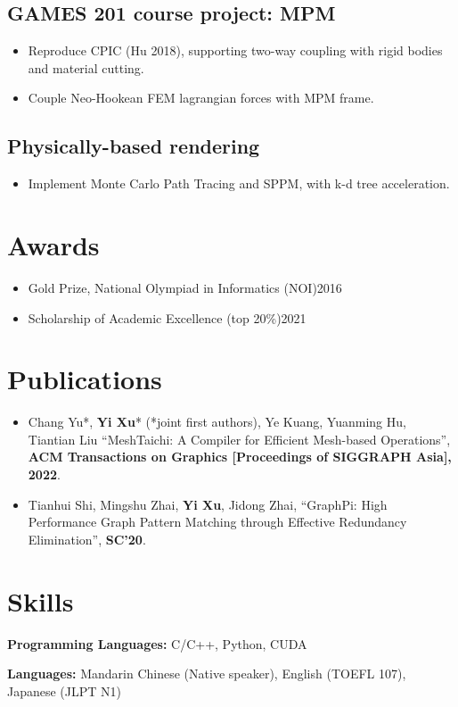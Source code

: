 \documentclass{resume}
\begin{document}
\subsection{\textbf{GAMES 201 course project: MPM}}
\begin{itemize}
  \item Reproduce CPIC (Hu 2018), supporting two-way coupling with rigid bodies and material cutting.
  \item Couple Neo-Hookean FEM lagrangian forces with MPM frame.
\end{itemize}

\subsection{\textbf{Physically-based rendering}}
\begin{itemize}
  \item Implement Monte Carlo Path Tracing and SPPM, with k-d tree acceleration.
\end{itemize}

\section{Awards}
\begin{itemize}
  \item Gold Prize, National Olympiad in Informatics (NOI)\hfill 2016
  \item Scholarship of Academic Excellence (top 20\%)\hfill 2021
\end{itemize}

\section{Publications}
\begin{itemize}
  \item Chang Yu*, \textbf{Yi Xu}* (*joint first authors), Ye Kuang, Yuanming Hu, Tiantian Liu   
  ``MeshTaichi: A Compiler for Efficient Mesh-based Operations'', 
  \textbf{ACM Transactions on Graphics [Proceedings of SIGGRAPH Asia], 2022}.

	
  \item Tianhui Shi, Mingshu Zhai, \textbf{Yi Xu}, Jidong Zhai, 
  ``GraphPi: High Performance Graph Pattern Matching through Effective Redundancy Elimination'', 
  \textbf{SC'20}.
\end{itemize}

\section{Skills}
\textbf{Programming Languages:} \small C/C++, Python, CUDA %

\textbf{Languages:} \small Mandarin Chinese (Native speaker), English (TOEFL 107), Japanese (JLPT N1)

%
%
\end{document}
